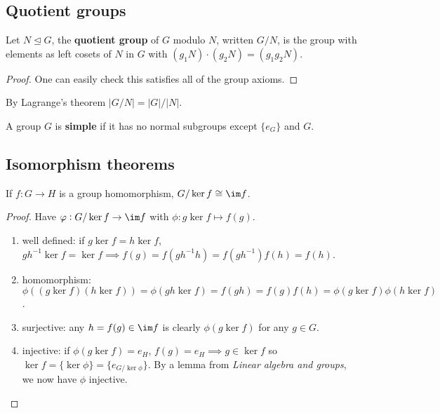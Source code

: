 \documentclass[../Year2.tex]{subfiles}
\begin{document}
\subsection{Quotient groups}

\begin{definition}
    Let $N\unlhd G$, the \textbf{quotient group} of $G$ modulo $N$, written $G/N$, is the group with elements as left cosets of $N$ in $G$ with $(g_1N)\cdot(g_2N) = (g_1g_2N)$.

    \begin{proof}
        One can easily check this satisfies all of the group axioms. 
    \end{proof}
\end{definition}

\begin{remark}
    By Lagrange's theorem $|G/N| = |G|/|N|$.
\end{remark}

\begin{definition}
    A group $G$ is \textbf{simple} if it has no normal subgroups except $\{e_G\}$ and $G$.
\end{definition}

\subsection{Isomorphism theorems}

\begin{theorem}\label{iso1}
    If $f:G\rightarrow H$ is a group homomorphism, $G/\ker f\cong \im f$.

    \begin{proof}
        Have $\phi:G/\ker f\rightarrow \im f$ with $\phi:g\ker f\mapsto f(g)$. \begin{enumerate}
            \item[]well defined: if $g\ker f=h\ker f$, $gh^{-1}\ker f= \ker f \implies f(g)=f(gh^{-1}h)=f(gh^{-1})f(h)=f(h)$.
            \item[]homomorphism: $\phi((g\ker f)(h\ker f)) = \phi(gh\ker f) = f(gh)=f(g)f(h)=\phi(g\ker f)\phi(h\ker f)$.
            \item[]surjective: any $h=f(g)\in\im f$ is clearly $\phi(g\ker f)$ for any $g\in G$.
            \item[]injective: if $\phi(g\ker f)=e_H$, $f(g)=e_H\implies g\in\ker f$ so $\ker f = \{\ker \phi\} = \{e_{G/\ker \phi}\}$. By a lemma from \textit{Linear algebra and groups}, we now have $\phi$ injective.
        \end{enumerate}
        \vspace{-20pt}
    \end{proof}
\end{theorem}
\end{document}
